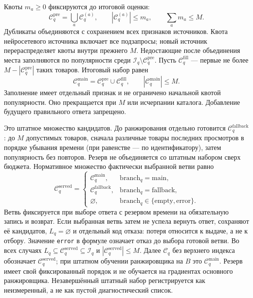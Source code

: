\documentclass[12pt,a4paper]{article}
\newcommand{\code}[1]{{\ttfamily\small\nolinkurl{#1}}}
\theoremstyle{plainru}
\begin{document}
Квоты $m_a\ge0$ фиксируются до итоговой оценки:
\begin{equation}\label{eq:model-candidate-union}
\mathcal C_q^{\mathrm{pre}}=\bigcup_a\mathcal C_q^{(a)},\qquad
|\mathcal C_q^{(a)}|\le m_a,\qquad
\sum_a m_a\le M.
\end{equation}
Дубликаты объединяются с сохранением всех признаков источников.
Квота нейросетевого источника включает все подзапросы;
новый источник перераспределяет квоты внутри прежнего $M$.
Недостающие после объединения места заполняются по популярности
среди $\mathcal I_q\setminus\mathcal C_q^{\mathrm{pre}}$.
Пусть $\mathcal C_q^{\mathrm{fill}}$ --- первые не более
$M-|\mathcal C_q^{\mathrm{pre}}|$ таких товаров. Итоговый набор равен
\begin{equation}\label{eq:model-candidate-fill}
\mathcal C_q^{\mathrm{main}}=\mathcal C_q^{\mathrm{pre}}\cup\mathcal C_q^{\mathrm{fill}},
\qquad |\mathcal C_q^{\mathrm{main}}|\le M.
\end{equation}
Заполнение имеет отдельный признак и не ограничено начальной квотой
популярности. Оно прекращается при $M$ или исчерпании каталога.
Добавление будущего правильного ответа запрещено.

Это штатное множество кандидатов. До ранжирования отдельно готовится
$\mathcal C_q^{\mathrm{fallback}}$: до $M$ допустимых товаров, сначала
различные товары последних просмотров в порядке убывания времени
(при равенстве --- по идентификатору), затем популярность без повторов.
Резерв не объединяется со штатным набором сверх бюджета.
Нормативное множество фактически выбранной ветви равно
\begin{equation}\label{eq:model-served-candidates}
\mathcal C_q^{\mathrm{served}}=
\begin{cases}
\mathcal C_q^{\mathrm{main}},&\mathrm{branch}_q=\mathrm{main},\\
\mathcal C_q^{\mathrm{fallback}},&\mathrm{branch}_q=\mathrm{fallback},\\
\varnothing,&\mathrm{branch}_q\in\{\mathrm{empty},\mathrm{error}\}.
\end{cases}
\end{equation}
Ветвь фиксируется при выборе ответа с резервом времени на обязательную
запись и возврат. Если выбранная ветвь затем не успела вернуть ответ,
сохраняют её кандидатов, $L_q=\varnothing$ и отдельный код отказа:
потеря относится к выдаче, а не к отбору. Значение \code{error} в формуле
означает отказ до выбора готовой ветви. Во всех случаях
$L_q\subseteq\mathcal C_q^{\mathrm{served}}\subseteq\mathcal I_q$
и $|\mathcal C_q^{\mathrm{served}}|\le M$.
Далее $\mathcal C_q$ без верхнего индекса обозначает
$\mathcal C_q^{\mathrm{served}}$; при штатном обучении ранжировщика на $B$
это $\mathcal C_q^{\mathrm{main}}$. Резерв имеет свой фиксированный порядок
и не обучается на градиентах основного ранжировщика. Незавершённый штатный
набор регистрируется как неизмеренный, а не как пустой диагностический список.
\end{document}
